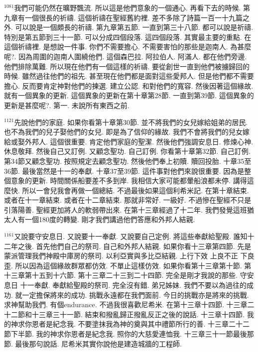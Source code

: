 \documentclass{book}
\begin{document}
$^{1081}$我們可能仍然在曠野飄流.
所以這是他們意象的一個通心.
再看下去的時候.
第九章有一個很長的祈禱.
這個祈禱在聖經舊約裡.
差不多除了詩篇一百一十九篇之外.
可以說是一個頗長的祈禱.
第九章第五節.
一直到第三十八節.
都可以說是祈禱.
特別是第五節到三十一節.
可以分成四個段落.
這四個段落.
其實最主要的重點.
在這個祈禱裡.
是想說一件事.
你們不需要擔心.
不需要害怕的那些是迦南人.
為甚麼呢?.
因為周圍的迦南人圍繞他們.
這個森巴拉.
阿拉伯人.
阿滿人.
都在他們旁邊.
他們排除萬難.
所以現在他們有一個這樣的祈禱.
要從創世一直到他們被擄歸回的時候.
雖然過往他們的祖先.
甚至現在他們都是面對這些愛邦人.
但是他們都不需要擔心.
反而要肯定神對他們的揀選.
建立公認.
和對他們的寬容.
然後因著這個緣故.
就有一個異象的更新.
這個異象的更新在第十章第28節.
一直到第39節.
這個異象的更新是甚麼呢?.
第一.
未說所有東西之前.

$^{1121}$先說他們的家庭.
如果你看第十章第30節.
並不將我們的女兒嫁給姐弟的居民.
也不為我們的兒子娶他們的女兒.
即是為了信仰的緣故.
我們不會將我們的兒女嫁給或娶外邦人.
這個很重要.
肯定他們家庭的聖潔.
然後他們強調安息日.
修煉心神.
休息敬拜.
然後自己又訂例.
又顧念聖功.
自己訂例.
你看第十章第32節.
自己訂例.
第34節又顧念聖功.
按照規定去顧念聖功.
然後他們奉上初贖.
贖回投胎.
十章35至36節.
最後當然是十一的奉獻.
十章37至39節.
這件事對他們來說很重要.
因為是整個意象的更新.
時間關係船要差不多到岸.
我相信大家可能都暈船浪都未停.
講得這麼快.
所以一會兒我會再做一個總結.
不過最後如果這個利希米記.
在第十章結束.
或者在十一章結束.
或者在十二章結束.
那就非常好.
一級好.
不過慘在聖經不只是引落陽善.
聖經更加將人的軟弱帶出來.
在第十三章經過了十二年.
我們發覺這班猶太人有一個180度的轉變.
剛才我們講過他們答應和外邦人結親.

$^{1161}$又說要守安息日.
又說要十一奉獻.
又說要自己定例.
將這些奉獻給聖殿.
誰知十二年之後.
首先他們自己的祭司.
自己和外邦人結親.
如果你看十三章第四節.
先是蒙派管理我們神殿中庫房的祭司.
以利亞實與多比亞結親.
上行下效 上良不正 下良歪.
所以因為這個緣故群眾都仿效.
不單止這樣仿效.
如果你看第十三章第十節.
第十三章第十五到十六節.
第十三章二十三到二十四節.
完全是剛才我說的那些.
守安息日 十一奉獻.
奉獻給聖殿的祭司.
完全沒有錯.
弟兄姊妹.
我們不要以為過往的成功.
就一定擔保將來的成功.
挑戰永遠都在我們面前.
今日的挑戰亦是將來的挑戰.
求神幫助我們.
有個endurance.
不過我很喜歡尼希米.
在第十三章十四節.
十三章二十二節和十三章三十一節.
結束和撥亂歸正撥亂反正之後的說話.
十三章十四節.
我的神求你恩者是紀念我.
不要塗抹我為神的奠與其中禮節所行的善.
十三章二十二節下半節.
我的神求你恩者是紀念我.
照你的大慈愛連恤我.
十三章三十一節最後那節.
最後那句說話.
尼希米其實你說他是建造城牆的工程師.
\end{document}
